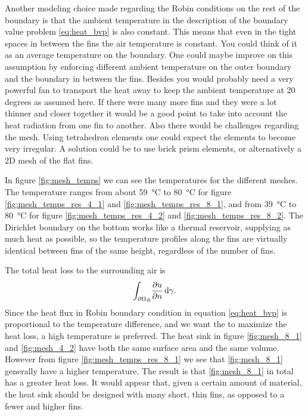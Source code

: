 Another modeling choice made regarding the Robin conditions on the rest of the boundary is that the ambient temperature in the description of the boundary value problem \eqref{eq:heat_bvp} is also constant. This means that even in the tight spaces in between the fins the air temperature is constant. You could think of it as an average temperature on the boundary. One could maybe improve on this assumption by enforcing different ambient temperature on the outer boundary and the boundary in between the fins. Besides you would probably need a very powerful fan to transport the heat away to keep the ambient temperature at 20 degrees as assumed here.
If there were many more fins and they were a lot thinner and closer together it would be a good point to take into account the heat radiation from one fin to another. Also there would be challenges regarding the mesh. Using tetrahedron elements one could expect the elements to become very irregular. A solution could be to use brick prism elements, or alternatively a 2D mesh of the flat fins.

In figure \ref{fig:mesh_temps} we can see the temperatures for the different meshes. The temperature ranges from about \SI{59}{\celsius} to \SI{80}{\celsius} for figure \ref{fig:mesh_temps_res_4_1} and \ref{fig:mesh_temps_res_8_1}, and from \SI{39}{\celsius} to \SI{80}{\celsius} for figure \ref{fig:mesh_temps_res_4_2} and \ref{fig:mesh_temps_res_8_2}. The Dirichlet boundary on the bottom works like a thermal reservoir, supplying as much heat as possible, so the temperature profiles along the fins are virtually identical between fins of the same height, regardless of the number of fins.

The total heat loss to the surrounding air is
\begin{equation}
    \int_{\partial\Omega_R}\! \pdv{u}{n}\, \mathrm{d}{\gamma}.
\end{equation}
Since the heat flux in Robin boundary condition in equation \eqref{eq:heat_bvp} is proportional to the temperature difference, and we want the to maximize the heat loss, a high temperature is preferred. The heat sink in figure \ref{fig:mesh_8_1} and \ref{fig:mesh_4_2} have both the same surface area and the same volume. However from figure \ref{fig:mesh_temps_res_8_1} we see that \ref{fig:mesh_8_1} generally have a higher temperature. The result is that \ref{fig:mesh_8_1} in total has a greater heat loss. It would appear that, given a certain amount of material, the heat sink should be designed with many short, thin fins, as opposed to a fewer and higher fins.
